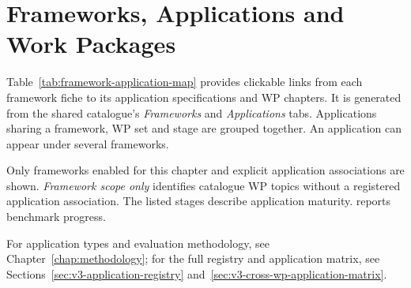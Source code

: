 \clearpage
\section{Frameworks, Applications and Work Packages}
\label{sec:framework-application-map}

Table~\ref{tab:framework-application-map} provides clickable links from each
framework fiche to its application specifications and WP chapters. It is
generated from the shared catalogue's \emph{Frameworks} and \emph{Applications}
tabs. Applications sharing a framework, WP set and stage are grouped together.
An application can appear under several frameworks.

Only frameworks enabled for this chapter and explicit application associations
are shown. \emph{Framework scope only} identifies catalogue WP topics without a
registered application association. The listed stages describe application
maturity.  reports benchmark progress.

For application types and evaluation methodology, see
Chapter~\ref{chap:methodology}; for the full registry and application matrix,
see Sections~\ref{sec:v3-application-registry}
and~\ref{sec:v3-cross-wp-application-matrix}.


